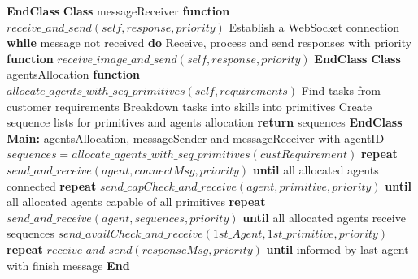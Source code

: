 \begin{breakablealgorithm}
\begin{algorithmic}[1]
\State \textbf{EndClass}
\State \textbf{Class} messageReceiver
    \State \textbf{\qquad function} {$receive\_and\_send(self, response, priority)$}
    \State \qquad \qquad Establish a WebSocket connection
    \State \textbf{\qquad \qquad while} message not received \textbf{do}
    \State \qquad \qquad \qquad Receive, process and send responses with priority
    \State \textbf{\qquad function} {$receive\_image\_and\_send(self, response, priority)$}
    \State \qquad {}    
    \State \textbf{EndClass}
\State \textbf{Class} agentsAllocation
    \State \textbf{\qquad function} {$allocate\_agents\_with\_seq\_primitives(self, requirements)$}
    \State \qquad \qquad Find tasks from customer requirements
    \State \qquad \qquad Breakdown tasks into skills into primitives
    \State \qquad \qquad Create sequence lists for primitives and agents allocation    
    \State \qquad \qquad \textbf{return} sequences
    \State \textbf{EndClass}
\State \textbf{Main:}
 agentsAllocation, messageSender and messageReceiver with agentID
\State \qquad $sequences = allocate\_agents\_with\_seq\_primitives(custRequirement)$
\State \qquad \textbf{repeat}
\State \qquad \qquad $send\_and\_receive(agent, connectMsg, priority)$
\State \qquad \textbf{until} all allocated agents connected
\State \qquad \textbf{repeat}
\State \qquad \qquad $send\_capCheck\_and\_receive(agent, primitive, priority)$
\State \qquad \textbf{until} all allocated agents capable of all primitives
\State \qquad \textbf{repeat}
\State \qquad \qquad $send\_and\_receive(agent, sequences, priority)$
\State \qquad \textbf{until} all allocated agents receive sequences
\State \qquad \qquad $send\_availCheck\_and\_receive(1st\_Agent, 1st\_primitive, priority)$
\State \qquad \textbf{repeat}
\State \qquad \qquad $receive\_and\_send(responseMsg, priority)$
\State \qquad \textbf{until} informed by last agent with finish message 
\State \textbf{End} 
\end{algorithmic}
\end{breakablealgorithm}

